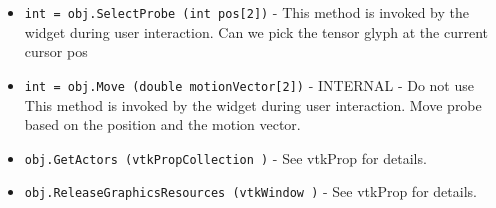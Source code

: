 \begin{itemize}
\item  \verb|int = obj.SelectProbe (int pos[2])| -  This method is invoked by the widget during user interaction.
 Can we pick the tensor glyph at the current cursor pos

\item  \verb|int = obj.Move (double motionVector[2])| -  INTERNAL - Do not use
 This method is invoked by the widget during user interaction.
 Move probe based on the position and the motion vector.

\item  \verb|obj.GetActors (vtkPropCollection )| -  See vtkProp for details.  

\item  \verb|obj.ReleaseGraphicsResources (vtkWindow )| -  See vtkProp for details.  

\end{itemize}
